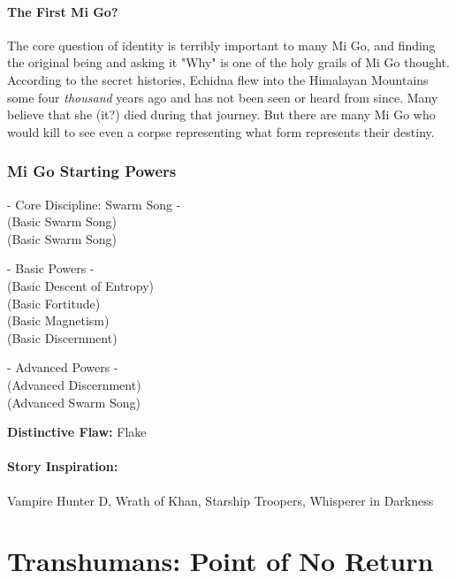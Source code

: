 \paragraph{The First Mi Go?} The core question of identity is terribly important to many Mi Go, and finding the original being and asking it "Why" is one of the holy grails of Mi Go thought. According to the secret histories, Echidna flew into the Himalayan Mountains some four \textit{thousand} years ago and has not been seen or heard from since. Many believe that she (it?) died during that journey. But there are many Mi Go who would kill to see even a corpse representing what form represents their destiny.

\subsubsection{Mi Go Starting Powers}

\hspace{\parindent} - Core Discipline: Swarm Song -\\
 (Basic Swarm Song)\\
 (Basic Swarm Song)

- Basic Powers -\\
 (Basic Descent of Entropy)\\
 (Basic Fortitude)\\
 (Basic Magnetism)\\
 (Basic Discernment)

- Advanced Powers -\\
 (Advanced Discernment)\\
 (Advanced Swarm Song)

\textbf{Distinctive Flaw:} Flake

\paragraph{Story Inspiration:} Vampire Hunter D, Wrath of Khan, Starship Troopers, Whisperer in Darkness

\section[Transhumans]{Transhumans: Point of No Return} 

